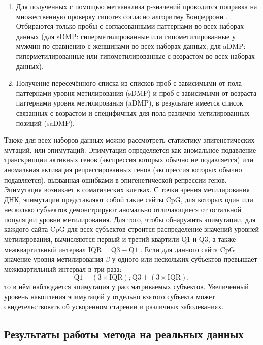 \begin{enumerate}
	\item Для полученных с помощью метаанализа p-значений проводится поправка на множественную проверку гипотез согласно алгоритму Бонферрони \autocite{bonferroni1936teoria}. Отбираются только пробы с согласованными паттернами во всех наборах данных (для sDMP: гиперметилированные или гипометилированные у мужчин по сравнению с женщинами во всех наборах данных; для aDMP: гиперметилированные или гипометилированные с возрастом во всех наборах данных).
	\item Получение пересечённого списка из списков проб с зависимыми от пола паттернами уровня метилирования (sDMP) и проб с зависимыми от возраста паттернами уровня метилирования (aDMP), в результате имеется список связанных с возрастом и специфичных для пола различно метилированных позиций (saDMP).
\end{enumerate}

Также для всех наборов данных можно рассмотреть статистику эпигенетических мутаций, или эпимутаций. Эпимутация определяется как аномальное подавление транскрипции активных генов (экспрессия которых обычно не подавляется) или аномальная активация репрессированных генов (экспрессия которых обычно подавляется), вызванная ошибками в эпигенетической репрессии генов. Эпимутация возникает в соматических клетках. С точки зрения метилирования ДНК, эпимутации представляют собой такие сайты CpG, для которых один или несколько субъектов демонстрируют аномально отличающиеся от остальной популяции уровни метилирования. Для того, чтобы обнаружить эпимутации, для каждого сайта CpG для всех субъектов строится распределение значений уровней метилирования, вычисляются первый и третий квартили Q1 и Q3, а также межквартильный интервал $\text{IQR} = \text{Q3} - \text{Q1}$ \autocite{Gentilini2015}. Если для данного сайта CpG значение уровня метилирования $\beta$ у одного или нескольких субъектов превышает межквартильный интервал в три раза:
\begin{equation}
\label{eq:iqr}
\text{Q1} - (3 \times \text{IQR}); \text{Q3} + (3 \times \text{IQR}), 
\end{equation}
то в нём наблюдается эпимутация у рассматриваемых субъектов. Увеличенный уровень накопления эпимутаций у отдельно взятого субъекта может свидетельствовать об ускоренном старении и различных заболеваниях.

\subsection{Результаты работы метода на реальных данных}\label{subsec:ch2/sec2/subsec2}

